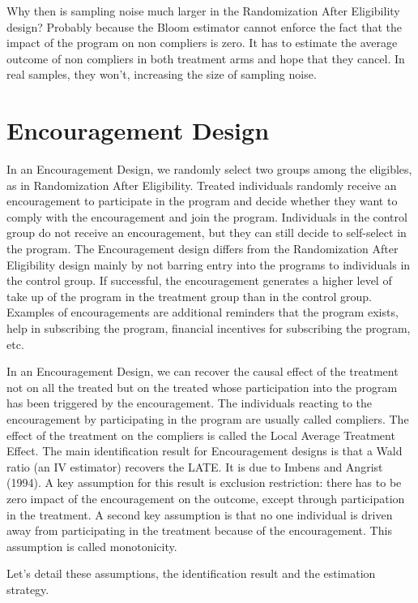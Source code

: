 \documentclass[]{book}
\theoremstyle{definition}
\theoremstyle{definition}
\theoremstyle{definition}
\theoremstyle{remark}
\begin{document}
Why then is sampling noise much larger in the Randomization After
Eligibility design? Probably because the Bloom estimator cannot enforce
the fact that the impact of the program on non compliers is zero. It has
to estimate the average outcome of non compliers in both treatment arms
and hope that they cancel. In real samples, they won't, increasing the
size of sampling noise.

\section{Encouragement Design}\label{sec:design4}

In an Encouragement Design, we randomly select two groups among the
eligibles, as in Randomization After Eligibility. Treated individuals
randomly receive an encouragement to participate in the program and
decide whether they want to comply with the encouragement and join the
program. Individuals in the control group do not receive an
encouragement, but they can still decide to self-select in the program.
The Encouragement design differs from the Randomization After
Eligibility design mainly by not barring entry into the programs to
individuals in the control group. If successful, the encouragement
generates a higher level of take up of the program in the treatment
group than in the control group. Examples of encouragements are
additional reminders that the program exists, help in subscribing the
program, financial incentives for subscribing the program, etc.

In an Encouragement Design, we can recover the causal effect of the
treatment not on all the treated but on the treated whose participation
into the program has been triggered by the encouragement. The
individuals reacting to the encouragement by participating in the
program are usually called compliers. The effect of the treatment on the
compliers is called the Local Average Treatment Effect. The main
identification result for Encouragement designs is that a Wald ratio (an
IV estimator) recovers the LATE. It is due to Imbens and Angrist (1994).
A key assumption for this result is exclusion restriction: there has to
be zero impact of the encouragement on the outcome, except through
participation in the treatment. A second key assumption is that no one
individual is driven away from participating in the treatment because of
the encouragement. This assumption is called monotonicity.

Let's detail these assumptions, the identification result and the
estimation strategy.
\end{document}

